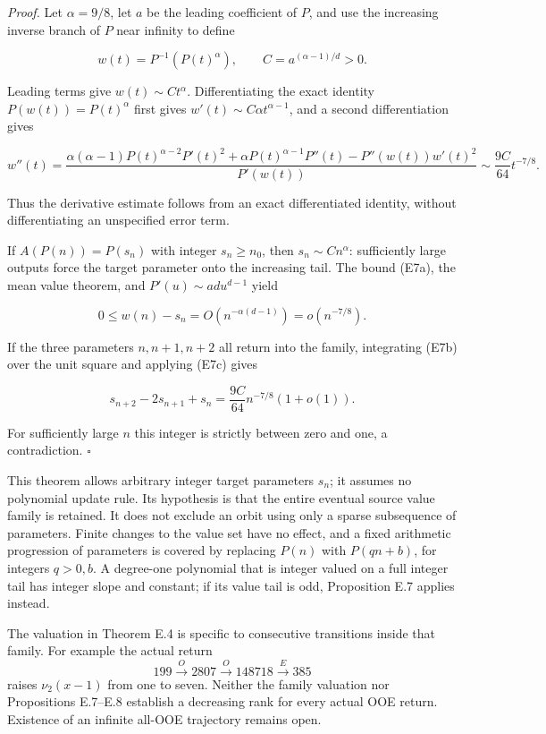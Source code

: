 \documentclass[12pt]{article}
\begin{document}
\emph{Proof.} Let \(\alpha=9/8\), let \(a\) be the leading coefficient
of \(P\), and use the increasing inverse branch of \(P\) near infinity
to define

\[
w(t)=P^{-1}(P(t)^\alpha),\qquad
C=a^{(\alpha-1)/d}>0.
\]

Leading terms give \(w(t)\sim Ct^\alpha\). Differentiating the exact
identity \(P(w(t))=P(t)^\alpha\) first gives
\(w'(t)\sim C\alpha t^{\alpha-1}\), and a second differentiation gives

\[
w''(t)=
\frac{\alpha(\alpha-1)P(t)^{\alpha-2}P'(t)^2
 +\alpha P(t)^{\alpha-1}P''(t)-P''(w(t))w'(t)^2}
 {P'(w(t))}
\sim\frac{9C}{64}t^{-7/8}.
\tag{E7b}
\]

Thus the derivative estimate follows from an exact differentiated
identity, without differentiating an unspecified error term.

If \(A(P(n))=P(s_n)\) with integer \(s_n\ge n_0\), then
\(s_n\sim Cn^\alpha\): sufficiently large outputs force the target
parameter onto the increasing tail. The bound (E7a), the mean value
theorem, and \(P'(u)\sim adu^{d-1}\) yield

\[
0\le w(n)-s_n=O(n^{-\alpha(d-1)})=o(n^{-7/8}).
\tag{E7c}
\]

If the three parameters \(n,n+1,n+2\) all return into the family,
integrating (E7b) over the unit square and applying (E7c) gives

\[
s_{n+2}-2s_{n+1}+s_n
=\frac{9C}{64}n^{-7/8}(1+o(1)).
\]

For sufficiently large \(n\) this integer is strictly between zero and
one, a contradiction. \(\square\)

This theorem allows arbitrary integer target parameters \(s_n\); it
assumes no polynomial update rule. Its hypothesis is that the entire
eventual source value family is retained. It does not exclude an orbit
using only a sparse subsequence of parameters. Finite changes to the
value set have no effect, and a fixed arithmetic progression of
parameters is covered by replacing \(P(n)\) with \(P(qn+b)\), for
integers \(q>0,b\). A degree-one polynomial that is integer valued on a
full integer tail has integer slope and constant; if its value tail is
odd, Proposition E.7 applies instead.

The valuation in Theorem E.4 is specific to consecutive transitions
inside that family. For example the actual return \[
199\xrightarrow O2807\xrightarrow O148718\xrightarrow E385
\] raises \(\nu_2(x-1)\) from one to seven. Neither the family valuation
nor Propositions E.7--E.8 establish a decreasing rank for every actual
OOE return. Existence of an infinite all-OOE trajectory remains open.
\end{document}
